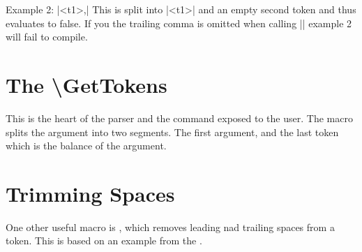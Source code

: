 Example 2: |<t1>,|
This is split into |<t1>| and an empty second token and thus evaluates
to false.
If you the trailing comma is omitted when calling |\SH@CheckTokenSep| example 2 will fail to compile.




\section*{The \textbackslash GetTokens}
This is the heart of the parser and the command exposed to the user. The macro splits the argument into two segments.
The first argument, and the last token which is the balance of the argument. 

\begin{teX}
%
\newcommand\GetTokens[3]{%
   \def\SH@FirstArgName{#1}%
   \def\SH@SecondArgName{#2}%
   \expandafter\SH@CheckTokenSep#3,\@empty%
   \ifx\SH@TokenValid\SH@true
       \expandafter\SH@GetTokens#3\@empty%
   \else
     \def\SH@token{#3}
        \ifx\SH@trimtokens\SH@true   %
           \expandafter\TrimSpaces\SH@token
        \fi
        \SH@DefineCommand{\SH@FirstArgName}{\SH@token}
          \SH@DefineCommand{\SH@SecondArgName}{}
        \fi
}
\end{teX}



\section*{Trimming Spaces}
One other useful macro is , which removes leading nad trailing spaces from a token. This is based on an example from the  \texbook.

